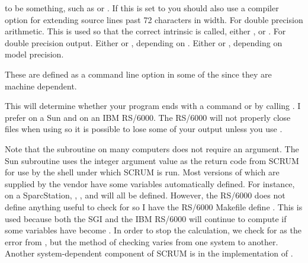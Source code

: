 \begin{klist}
\begin{klist}
  to be something, such as  or .  If this is
  set to  you should also use a compiler option
  for extending source lines past 72 characters in width.
         For double precision arithmetic.
          This is used so that the correct intrinsic
  is called, either ,  or .
      For double precision output.
      Either  or ,
  depending on .
      Either  or ,
  depending on model precision.
  \end{klist}
   These are defined as a command line option in
some of the  since they are machine dependent.
  \begin{klist}
     This will determine whether your program ends with
  a  command or by calling .  I prefer
   on a Sun and  on an IBM RS/6000.  The RS/6000
  will not properly close files when using  so it is
  possible to lose some of your output unless you use .

    Note that the  subroutine on many computers does not
  require an argument.  The Sun  subroutine uses
  the integer argument value as the return code from SCRUM for use by
  the shell under which SCRUM is run.
     Most versions of  which are supplied by the
  vendor have some variables automatically defined.  For instance, on a
  SparcStation, , , and  will all be
  defined.  However, the RS/6000  does not define anything
  useful to check for so I have the RS/6000 Makefile define
  .  This is used because both the SGI and the IBM
  RS/6000 will continue to compute if some variables have become
  .  In order to stop the calculation, we check for 
  as the error from , but the method of checking varies
  from one system to another.  Another system-dependent component of
  SCRUM is in the implementation of .
  \end{klist}
\end{klist}

